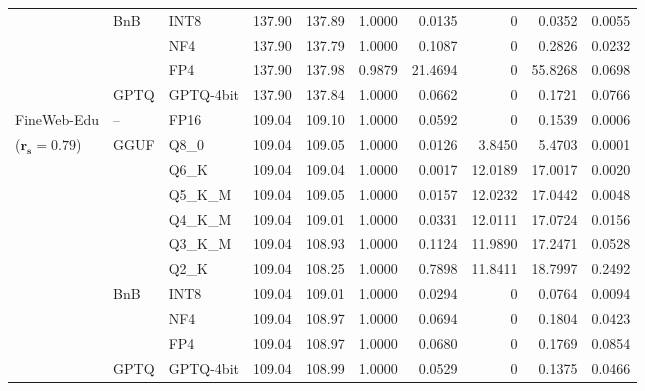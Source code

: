 \begin{longtable}{ll l rrrrrrr}
 & BnB & INT8 & 137.90 & 137.89 & 1.0000 & 0.0135 & \cellcolor{cyan!12} $0$ & 0.0352 & 0.0055 \\
 &  & NF4 & 137.90 & 137.79 & 1.0000 & 0.1087 & \cellcolor{cyan!12} $0$ & 0.2826 & 0.0232 \\
 &  & FP4 & 137.90 & 137.98 & 0.9879 & 21.4694 & \cellcolor{cyan!12} $0$ & 55.8268 & 0.0698 \\
 & GPTQ & GPTQ-4bit & 137.90 & 137.84 & 1.0000 & 0.0662 & \cellcolor{cyan!12} $0$ & 0.1721 & 0.0766 \\
\midrule
FineWeb-Edu & -- & FP16 & 109.04 & 109.10 & 1.0000 & 0.0592 & \cellcolor{cyan!12} $0$ & 0.1539 & 0.0006 \\
{\small ($\mathbf{r_s{=}0.79}$)} & GGUF & Q8\_0 & 109.04 & 109.05 & 1.0000 & 0.0126 & 3.8450 & 5.4703 & 0.0001 \\
 &  & Q6\_K & 109.04 & 109.04 & 1.0000 & 0.0017 & 12.0189 & 17.0017 & 0.0020 \\
 &  & Q5\_K\_M & 109.04 & 109.05 & 1.0000 & 0.0157 & 12.0232 & 17.0442 & 0.0048 \\
 &  & Q4\_K\_M & 109.04 & 109.01 & 1.0000 & 0.0331 & 12.0111 & 17.0724 & 0.0156 \\
 &  & Q3\_K\_M & 109.04 & 108.93 & 1.0000 & 0.1124 & 11.9890 & 17.2471 & 0.0528 \\
 &  & Q2\_K & 109.04 & 108.25 & 1.0000 & 0.7898 & 11.8411 & 18.7997 & 0.2492 \\
 & BnB & INT8 & 109.04 & 109.01 & 1.0000 & 0.0294 & \cellcolor{cyan!12} $0$ & 0.0764 & 0.0094 \\
 &  & NF4 & 109.04 & 108.97 & 1.0000 & 0.0694 & \cellcolor{cyan!12} $0$ & 0.1804 & 0.0423 \\
 &  & FP4 & 109.04 & 108.97 & 1.0000 & 0.0680 & \cellcolor{cyan!12} $0$ & 0.1769 & 0.0854 \\
 & GPTQ & GPTQ-4bit & 109.04 & 108.99 & 1.0000 & 0.0529 & \cellcolor{cyan!12} $0$ & 0.1375 & 0.0466 \\
\end{longtable}
\endgroup